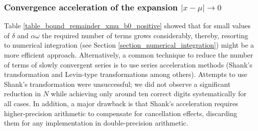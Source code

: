 \documentclass[10pt,a4paper,oneside]{article}
\numberwithin{equation}{section}
\begin{document}
\begin{table}[H]
	\centering
	\caption{The remainder of the series expansion  \eqref{expansion_xmu_b0_positive} and bound \eqref{bound_remainder_xmu_b0_positive}, estimating $N$ using \eqref{N_expansion_xmu_b0_positive} to achieve machine precision.}
	\label{table_bound_remainder_xmu_b0_positive}
\end{table}

\subsubsection{Convergence acceleration of the expansion $|x-\mu| \to 0$}
Table \ref{table_bound_remainder_xmu_b0_positive} showed that for small values of $\delta$ and $\alpha \omega$ the required number of terms grows considerably, thereby, resorting to numerical integration (see Section \ref{section_numerical_integration}) might be a more efficient approach. Alternatively, a common technique to reduce the number of terms of slowly convergent series is to use series acceleration methods (Shank's transformation and Levin-type transformations among others). 
Attempts to use Shank's transformation were unsuccessful; we did not observe a significant reduction in $N$ while achieving only around ten correct digits systematically for all cases. In addition, a major drawback is that Shank's acceleration requires higher-precision arithmetic to compensate for cancellation effects, discarding them for any implementation in double-precision arithmetic. 
\end{document}
